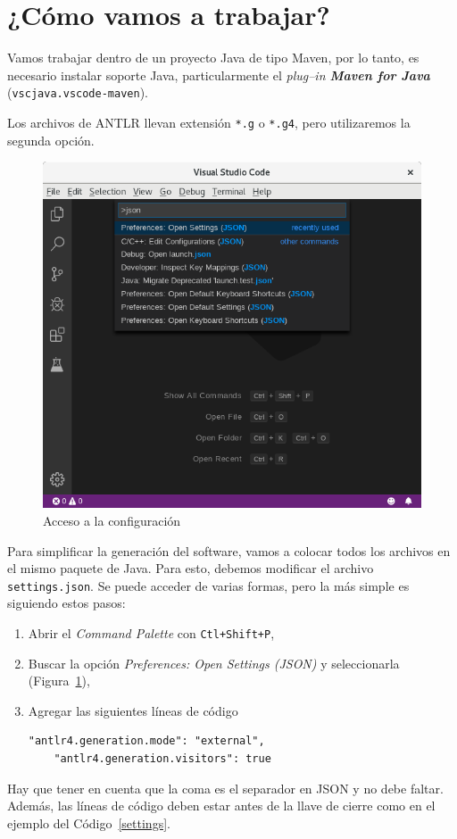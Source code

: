 \documentclass[a5paper,10pt]{article}
\begin{document}
\section{¿Cómo vamos a trabajar?}

Vamos trabajar dentro de un proyecto Java de tipo Maven, por lo tanto, es necesario instalar soporte Java, particularmente el \emph{plug--in \textbf{Maven for Java}} (\verb|vscjava.vscode-maven|).

Los archivos de ANTLR llevan extensión \verb|*.g| o \verb|*.g4|, pero utilizaremos la segunda opción.

\begin{figure}[p]
	\centering
	\includegraphics[width=.9\textwidth]{SelectJSON}
	\caption{Acceso a la configuración}
	\label{preferences}
\end{figure}

Para simplificar la generación del software, vamos a colocar todos los archivos en el mismo paquete de Java.  Para esto, debemos modificar el archivo \verb|settings.json|.  Se puede acceder de varias formas, pero la más simple es siguiendo estos pasos:
\begin{enumerate}
	\item Abrir el \emph{Command Palette} con \verb|Ctl+Shift+P|,
	\item Buscar la opción \emph{Preferences: Open Settings (JSON)} y seleccionarla (Figura~\ref{preferences}),
	\item Agregar las siguientes líneas de código
	\begin{lstlisting}[style=consola]
	"antlr4.generation.mode": "external",
	"antlr4.generation.visitors": true
	\end{lstlisting}
\end{enumerate}
Hay que tener en cuenta que la coma es el separador en JSON y no debe faltar.  Además, las líneas de código deben estar antes de la llave de cierre como en el ejemplo del Código~\ref{settings}.
\end{document}
